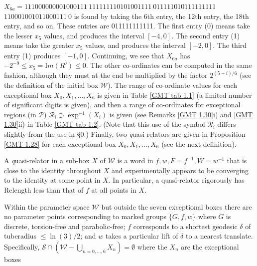 \begin{remark}
\begin{remark}
\noindent 
$X_{6a} = 
111000000001000111\ 
111111110101001111\ 
011111010111111111$\hfill
{}
  \hfill $  
110001001011000111\ 0$
\vglue4pt\noindent 
is found by taking the 6th entry, the 12th entry, the 18th entry, and so on.  These entries are 011111111111.  The first entry (0) means take the
lesser $x_5$ values, and produces the interval $[-4,0].$  The second entry (1) means take the greater $x_5$ values, and produces the interval
$[-2,0].$  The third entry (1) produces $[-1,0].$  Continuing, we see that $X_{6a}^{\phantom{|}}$ has $-2^{-9} \le x_5 = {\mathrm Im}(R') \le 0.$  The other
co-ordinates can be computed in the same fashion, although they must at the end be multiplied by the factor $2^{(5 - i)/6}$ (see the definition of the
initial box
${\mathcal W}$).  The range of co-ordinate values for each  exceptional  box $X_0, X_1, \ldots, X_6$ is given in Table \ref{GMT tab 1.1} (a limited number of significant
digits is given), and  then a range of co-ordinates for exceptional regions (in ${\mathcal P}$) 
${\mathcal R}_i \supset \exp^{-1}(X_i)$ is given (see
Remarks \ref{GMT 1.30}i) and \ref{GMT 1.30}ii)
in Table \ref{GMT tab 1.2}. (Note that this use of the symbol ${\mathcal R}_i$ differs
slightly from the use in \S 0.)
Finally, two {\textit quasi-relators} are given in Proposition \ref{GMT 1.28} for each exceptional box $X_0, X_1, \ldots, X_6$ (see the next definition).\end{remark}
 
\begin{definition} \label{GMT 1.27} A {\textit quasi-relator} in a sub-box $X$ of ${\mathcal W}$ is a word in $f,w,F=f^{-1},W=w^{-1}$ that is close to the identity
throughout
$X$ and experimentally appears to be converging to the identity at some point in $X.$  In particular, a quasi-relator rigorously has Relength less than
that of $f$ at all points in $X.$
\end{definition}

\begin{proposition}\label{GMT 1.28}  
Within the parameter space ${\mathcal W}$ but outside the seven exceptional boxes there are no parameter points corresponding to 
marked groups $\{G,f,w\}$ where $G$ is 
discrete{\textrm ,} torsion\/{\textrm -}\/free and  parabolic\/{\textrm -}\/free\/{\textrm ;}
$f$ corresponds to a shortest geodesic $\delta$ of tuberadius $\le
\ln(3)/2${\textrm ;} and $w$ takes a particular lift of $\delta$ to 
a nearest translate.
 Specifically{\textrm ,} 
${\mathcal S} \cap ({\mathcal W} - \bigcup_{n = 0,\dots, 6} X_n)=\emptyset$ where the $X_n$ are the exceptional boxes


\end{proposition}
\end{remark}
